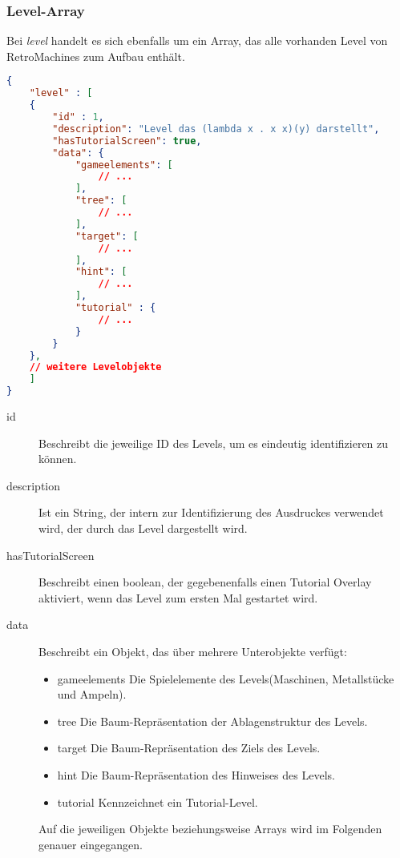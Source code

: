 \begin{minipage}{1\textwidth}

\subsubsection{Level-Array}

Bei \textit{level} handelt es sich ebenfalls um ein Array, das alle vorhanden Level von RetroMachines zum Aufbau enthält.

\begin{lstlisting}[language=json, firstnumber=1]
{
    "level" : [
    {
        "id" : 1,
        "description": "Level das (lambda x . x x)(y) darstellt",
        "hasTutorialScreen": true,
        "data": {
            "gameelements": [
                // ...
            ],
            "tree": [
                // ...
            ],
            "target": [
                // ...
            ],
            "hint": [
                // ...
            ],
            "tutorial" : {
            	// ...
            }
        }
    },
    // weitere Levelobjekte
    ]
}
\end{lstlisting}

\begin{description}
	\item[id] Beschreibt die jeweilige ID des Levels, um es eindeutig identifizieren zu können.
	\item[description] Ist ein String, der intern zur Identifizierung des Ausdruckes verwendet wird, der durch das Level dargestellt wird.
	\item[hasTutorialScreen] Beschreibt einen boolean, der gegebenenfalls einen Tutorial Overlay aktiviert, wenn das Level zum ersten Mal gestartet wird.
	\item[data] Beschreibt ein Objekt, das über mehrere Unterobjekte verfügt:
		\begin{itemize} 
			\item gameelements Die Spielelemente des Levels(Maschinen, Metallstücke und Ampeln).
			\item tree Die Baum-Repräsentation der Ablagenstruktur des Levels.
			\item target Die Baum-Repräsentation des Ziels des Levels.
			\item hint Die Baum-Repräsentation des Hinweises des Levels.
			\item tutorial Kennzeichnet ein Tutorial-Level.
		\end{itemize}
	Auf die jeweiligen Objekte beziehungsweise Arrays wird im Folgenden genauer eingegangen.
\end{description}

\end{minipage}


